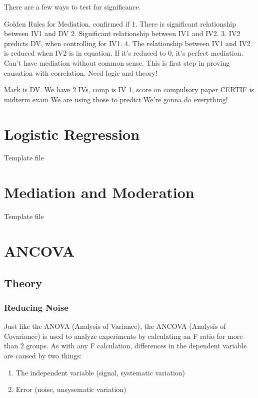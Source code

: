 \documentclass[]{book}
\providecommand{\tightlist}{%
  \setlength{\itemsep}{0pt}\setlength{\parskip}{0pt}}
\theoremstyle{definition}
\theoremstyle{definition}
\theoremstyle{definition}
\theoremstyle{remark}
\begin{document}
There are a few ways to test for significance.

Golden Rules for Mediation, confirmed if 1. There is significant
relationship between IV1 and DV 2. Significant relationship between IV1
and IV2. 3. IV2 predicts DV, when controlling for IV1. 4. The
relationship between IV1 and IV2 is reduced when IV2 is in equation. If
it's reduced to 0, it's perfect mediation. Can't have mediation without
common sense. This is first step in proving causation with correlation.
Need logic and theory!

Mark is DV. We have 2 IVs, comp is IV 1, score on compulsory paper
CERTIF is midterm exam We are using those to predict We're gonna do
everything!

\chapter{Logistic Regression}\label{logistic-regression}

Template file

\chapter{Mediation and Moderation}\label{mediation-and-moderation}

Template file

\chapter{ANCOVA}\label{ancova}

\section{Theory}\label{theory-1}

\subsection{Reducing Noise}\label{reducing-noise}

Just like the ANOVA (Analysis of Variance), the ANCOVA (Analysis of
Covariance) is used to analyze experiments by calculating an F ratio for
more than 2 groups. As with any F calculation, differences in the
dependent variable are caused by two things:

\begin{enumerate}
\def\labelenumi{\arabic{enumi}.}
\tightlist
\item
  The independent variable (signal, systematic variation)
\item
  Error (noise, unsysematic variation)
\end{enumerate}
\end{document}
